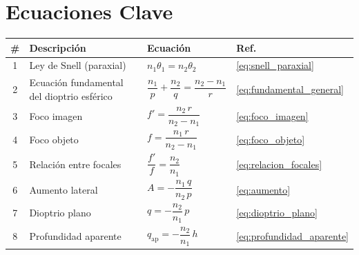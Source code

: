 \documentclass[12pt, a4paper]{article}
\theoremstyle{definition}
\begin{document}
\section*{Ecuaciones Clave}

\begin{center}
\begin{tabular}{@{}clll@{}}
\toprule
\textbf{\#} & \textbf{Descripción} & \textbf{Ecuación} & \textbf{Ref.} \\
\midrule
1 & Ley de Snell (paraxial) &
  \(\displaystyle n_1\theta_1 = n_2\theta_2\) &
  \eqref{eq:snell_paraxial} \\[6pt]
2 & Ecuación fundamental del dioptrio esférico &
  \(\displaystyle \dfrac{n_1}{p} + \dfrac{n_2}{q} = \dfrac{n_2 - n_1}{r}\) &
  \eqref{eq:fundamental_general} \\[10pt]
3 & Foco imagen &
  \(\displaystyle f' = \dfrac{n_2\, r}{n_2 - n_1}\) &
  \eqref{eq:foco_imagen} \\[10pt]
4 & Foco objeto &
  \(\displaystyle f = \dfrac{n_1\, r}{n_2 - n_1}\) &
  \eqref{eq:foco_objeto} \\[10pt]
5 & Relación entre focales &
  \(\displaystyle \dfrac{f'}{f} = \dfrac{n_2}{n_1}\) &
  \eqref{eq:relacion_focales} \\[10pt]
6 & Aumento lateral &
  \(\displaystyle A = -\dfrac{n_1\, q}{n_2\, p}\) &
  \eqref{eq:aumento} \\[10pt]
7 & Dioptrio plano &
  \(\displaystyle q = -\dfrac{n_2}{n_1}\,p\) &
  \eqref{eq:dioptrio_plano} \\[10pt]
8 & Profundidad aparente &
  \(\displaystyle q_{\text{ap}} = -\dfrac{n_2}{n_1}\,h\) &
  \eqref{eq:profundidad_aparente} \\
\bottomrule
\end{tabular}
\end{center}
\end{document}
